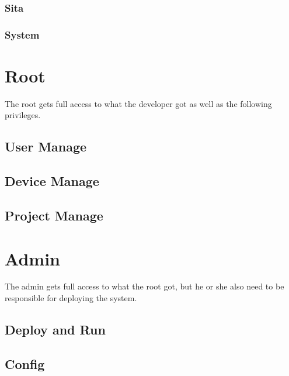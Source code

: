 \documentclass{paper}
\begin{document}
\subsubsection{Sita}

\subsubsection{System}

\section{Root}
The root gets full access to what the developer got as well as the following privileges.
\subsection{User Manage}
\subsection{Device Manage}
\subsection{Project Manage}

\section{Admin}
The admin gets full access to what the root got, but he or she also need to be responsible for deploying the system.
\subsection{Deploy and Run}

\subsection{Config}
\end{document}
